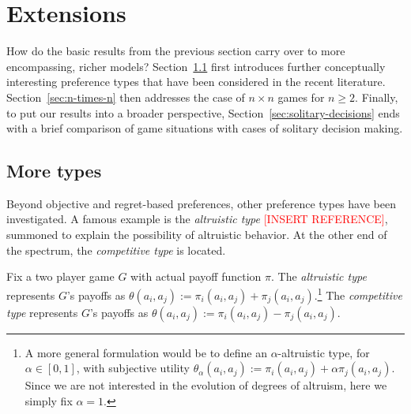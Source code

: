 \documentclass[fleqn,reqno,11pt]{article}
\begin{document}
\section{Extensions}
\label{sec:extensions}

How do the basic results from the previous section carry over to more encompassing, richer
models? Section~\ref{sec:more-types} first introduces further conceptually interesting
preference types that have been considered in the recent
literature. Section~\ref{sec:n-times-n} then addresses the case of $n \times n$ games for
$n \ge 2$. Finally, to put our results into a broader perspective,
Section~\ref{sec:solitary-decisions} ends with a brief comparison of game situations with cases
of solitary decision making.

\subsection{More types}
\label{sec:more-types}


Beyond objective and regret-based preferences, other preference types have been investigated. A
famous example is the \textit{altruistic type} \textcolor{red}{[INSERT REFERENCE]}, summoned to
explain the possibility of altruistic behavior. At the other end of the spectrum, the \emph{competitive
type} is located. 

\begin{definition} \label{defn:alttype}

  Fix a two player game $G$ with actual payoff function $\pi$. The \textit{altruistic type}
  represents $G$'s payoffs as $\theta(a_i, a_j):=\pi_i(a_i,a_j) + \pi_j(a_i,a_j)$.\footnote{A
    more general formulation would be to define an $ \alpha$-altruistic type, for
    $\alpha \in [0,1]$, with subjective utility
    $ \theta_\alpha(a_i, a_j):=\pi_i(a_i,a_j) + \alpha \pi_j(a_i,a_j)$. Since we are not
    interested in the evolution of degrees of altruism, here we simply fix $ \alpha = 1 $.} The
  \emph{competitive type} represents $G$'s payoffs as
  $\theta(a_i, a_j):=\pi_i(a_i,a_j) - \pi_j(a_i,a_j)$.

\end{definition}
\end{document}
